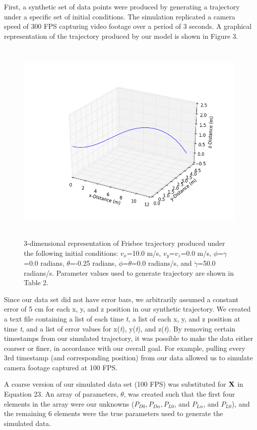 \documentclass[a4paper,12pt, oneside]{article}
\begin{document}
First, a synthetic set of data points were produced by generating a trajectory under a specific set of initial conditions. The simulation replicated a camera speed of 300 FPS capturing video footage over a period of 3 seconds. A graphical representation of the trajectory produced by our model is shown in Figure 3. 
\begin{figure}[h]
	\centering
	\includegraphics[width=16cm, height=10cm]{Simulated_throw_graph}
	\caption{3-dimensional representation of Frisbee trajectory produced under the following initial conditions: $v_x$=10.0 m/s, $v_y$=$v_z$=0.0 m/s, $\phi$=$\gamma$=0.0 radians, $\theta$=-0.25 radians, $\dot\phi$=$\dot\theta$=0.0 radians/s, and $\dot\gamma$=50.0 radians/s. Parameter values used to generate trajectory are shown in Table 2. }
\end{figure}

Since our data set did not have error bars, we arbitrarily assumed a constant error of 5 cm for each x, y, and z position in our synthetic trajectory. We created a text file containing a list of each time \textit{t}, a list of each x, y, and z position at time \textit{t}, and a list of error values for x(\textit{t}), y(\textit{t}), and z(\textit{t}). By removing certain timestamps from our simulated trajectory, it was possible to make the data either coarser or finer, in accordance with our overall goal. For example, pulling every 3rd timestamp (and corresponding position) from our data  allowed us to simulate camera footage captured at 100 FPS.

A coarse version of our simulated data set (100 FPS) was substituted for $\bold{X}$ in Equation 23. An array of parameters, $\theta$, was created such that the first four elements in the array were our unknowns ($P_{D0}, P_{D\alpha}, P_{L0}$, and $P_{L\alpha}$, and $P_{L0}$), and the remaining 6 elements were the true parameters used to generate the simulated data.
\end{document}
